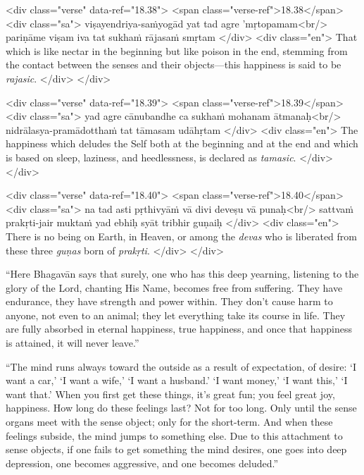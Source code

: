\begin{html}
<div class="verse" data-ref="18.38">
  <span class="verse-ref">18.38</span>
  <div class="sa">
    viṣayendriya-saṁyogād yat tad agre ’mṛtopamam<br/>
    pariṇāme viṣam iva tat sukhaṁ rājasaṁ smṛtam
  </div>
  <div class="en">
    That which is like nectar in the beginning but like poison in the end, stemming from the contact between the senses and their objects---this happiness is said to be \textit{rajasic}.
  </div>
</div>
\end{html}



\begin{html}
<div class="verse" data-ref="18.39">
  <span class="verse-ref">18.39</span>
  <div class="sa">
    yad agre cānubandhe ca sukhaṁ mohanam ātmanaḥ<br/>
    nidrālasya-pramādotthaṁ tat tāmasam udāhṛtam
  </div>
  <div class="en">
    The happiness which deludes the Self both at the beginning and at the end and which is based on sleep, laziness, and heedlessness, is declared as \textit{tamasic}.
  </div>
</div>
\end{html}



\begin{html}
<div class="verse" data-ref="18.40">
  <span class="verse-ref">18.40</span>
  <div class="sa">
    na tad asti pṛthivyāṁ vā divi deveṣu vā punaḥ<br/>
    sattvaṁ prakṛti-jair muktaṁ yad ebhiḥ syāt tribhir guṇaiḥ
  </div>
  <div class="en">
    There is no being on Earth, in Heaven, or among the \textit{devas} who is liberated from these three \textit{guṇas} born of \textit{prakṛti}.
  </div>
</div>
\end{html}


\enquote{Here Bhagavān says that surely, one who has this deep yearning, listening to the glory of the Lord, chanting His Name, becomes free from suffering. They have endurance, they have strength and power within. They don’t cause harm to anyone, not even to an animal; they let everything take its course in life. They are fully absorbed in eternal happiness, true happiness, and once that happiness is attained, it will never leave.}

\enquote{The mind runs always toward the outside as a result of expectation, of desire: \enquote{I want a car,} \enquote{I want a wife,} \enquote{I want a husband.} \enquote{I want money,} \enquote{I want this,} \enquote{I want that.} When you first get these things, it’s great fun; you feel great joy, happiness. How long do these feelings last? Not for too long. Only until the sense organs meet with the sense object; only for the short-term. And when these feelings subside, the mind jumps to something else. Due to this attachment to sense objects, if one fails to get something the mind desires, one goes into deep depression, one becomes aggressive, and one becomes deluded.}

